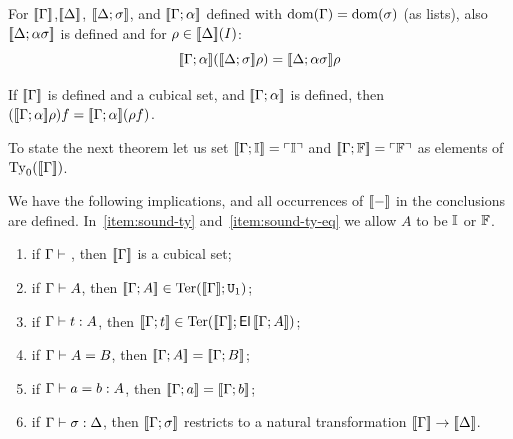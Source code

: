 \begin{lemma}[Substitution]
  \label{lem:subst-ok}
  For $[\![\Gamma]\!]$,$[\![\Delta]\!]$, $[\![\Delta;\sigma]\!]$, and
  $[\![\Gamma;\alpha]\!]$ defined with $\operatorname{dom}(\Gamma) = \operatorname{dom} (\sigma)$
  (as lists), also $[\![\Delta; \alpha \sigma]\!]$ is defined and for
  $\rho \in [\![\Delta]\!](I)$:
  \[
  [\![\Gamma;\alpha]\!] ([\![\Delta;\sigma]\!] \rho) = [\![\Delta; \alpha
    \sigma]\!] \rho
  \]
\end{lemma}

\begin{lemma}
  \label{lem:term-ok}
  If $[\![\Gamma]\!]$ is defined and a cubical set, and
  $[\![\Gamma;\alpha]\!]$ is defined, then $([\![\Gamma;\alpha]\!] \rho) f
  = [\![\Gamma;\alpha]\!] (\rho f)$.
\end{lemma}

To state the next theorem let us set $[\![\Gamma;\mathbb{I}]\!] = \ulcorner \mathbb{I} \urcorner$
and $[\![\Gamma;\mathbb{F}]\!] = \ulcorner \mathbb{F} \urcorner$ as elements of $\operatorname{Ty}_0
([\![\Gamma]\!])$.

\begin{theorem}[Soundness]
  \label{thm:sound}
  We have the following implications, and all occurrences of $[\![-]\!]$
  in the conclusions are defined.  In~\eqref{item:sound-ty}
  and~\eqref{item:sound-ty-eq} we allow $A$ to be $\mathbb{I}$ or $\mathbb{F}$.
  \begin{enumerate}
  \item if $\Gamma \vdash {}$, then $[\![\Gamma]\!]$ is a cubical set;
  \item if $\Gamma \vdash A$, then $[\![\Gamma; A]\!] \in \operatorname{Ter}
    ([\![\Gamma]\!]; \mathtt{U}_1)$;
  \item\label{item:sound-ty} if $\Gamma \vdash t : A$, then
    $[\![\Gamma; t]\!] \in \operatorname{Ter} ([\![\Gamma]\!]; \operatorname{\mathsf{El}} {[\![\Gamma;A]\!]})$;
  \item if $\Gamma \vdash A = B$, then $[\![\Gamma;A]\!] = [\![\Gamma;B]\!]$;
  \item\label{item:sound-ty-eq} if $\Gamma \vdash a = b : A$, then
    $[\![\Gamma;a]\!] = [\![\Gamma;b]\!]$;
  \item if $\Gamma \vdash \sigma : \Delta$, then $[\![\Gamma;\sigma]\!]$
    restricts to a natural transformation $[\![\Gamma]\!]\to
    [\![\Delta]\!]$.
  \end{enumerate}
\end{theorem}




